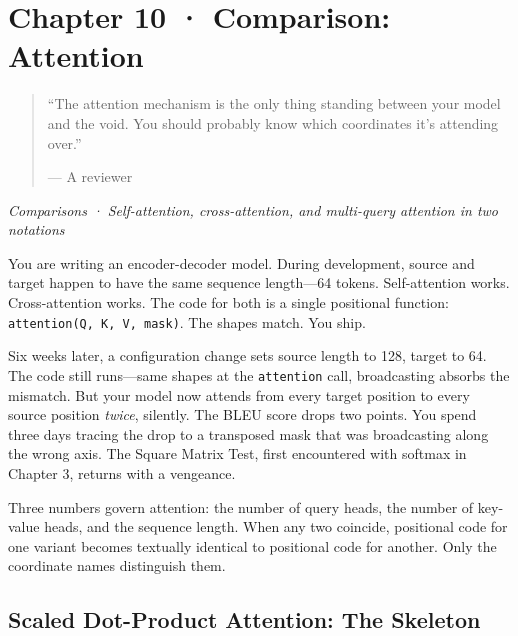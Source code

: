\documentclass[11pt,titlepage]{article}
\begin{document}
\newpage

\hypertarget{chapter-10-comparison-attention}{%
\section{Chapter 10 · Comparison:
Attention}\label{chapter-10-comparison-attention}}

\begin{quote}
``The attention mechanism is the only thing standing between your model
and the void. You should probably know which coordinates it's attending
over.''

--- A reviewer
\end{quote}

\emph{Comparisons · Self-attention, cross-attention, and multi-query
attention in two notations}

\vspace{2em}

You are writing an encoder-decoder model. During development, source and
target happen to have the same sequence length---64 tokens.
Self-attention works. Cross-attention works. The code for both is a
single positional function: \texttt{attention(Q,\ K,\ V,\ mask)}. The
shapes match. You ship.

Six weeks later, a configuration change sets source length to 128,
target to 64. The code still runs---same shapes at the
\texttt{attention} call, broadcasting absorbs the mismatch. But your
model now attends from every target position to every source position
\emph{twice}, silently. The BLEU score drops two points. You spend three
days tracing the drop to a transposed mask that was broadcasting along
the wrong axis. The Square Matrix Test, first encountered with softmax
in Chapter 3, returns with a vengeance.

Three numbers govern attention: the number of query heads, the number of
key-value heads, and the sequence length. When any two coincide,
positional code for one variant becomes textually identical to
positional code for another. Only the coordinate names distinguish them.

\vspace{2em}

\hypertarget{scaled-dot-product-attention-the-skeleton}{%
\subsection{Scaled Dot-Product Attention: The
Skeleton}\label{scaled-dot-product-attention-the-skeleton}}
\end{document}
